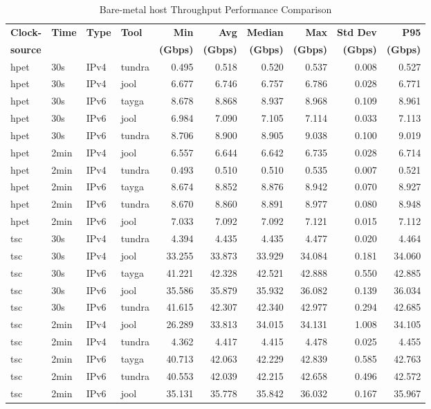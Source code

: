 \begin{table}[htbp]
\centering
\caption{Bare-metal host Throughput Performance Comparison}
\label{tab:throughput_comparison_localsingle}
\footnotesize
\begin{tabular}{|l|l|l|l|r|r|r|r|r|r|}
\hline
\textbf{Clock-} & \textbf{Time} & \textbf{Type} & \textbf{Tool} & \textbf{Min} & \textbf{Avg} & \textbf{Median} & \textbf{Max} & \textbf{Std Dev} & \textbf{P95} \\
\textbf{source} & & & & \textbf{(Gbps)} & \textbf{(Gbps)} & \textbf{(Gbps)} & \textbf{(Gbps)} & \textbf{(Gbps)} & \textbf{(Gbps)} \\
\hline
hpet & 30s & IPv4 & tundra & 0.495 & 0.518 & 0.520 & 0.537 & 0.008 & 0.527 \\
hpet & 30s & IPv4 & jool & 6.677 & 6.746 & 6.757 & 6.786 & 0.028 & 6.771 \\
hpet & 30s & IPv6 & tayga & 8.678 & 8.868 & 8.937 & 8.968 & 0.109 & 8.961 \\
hpet & 30s & IPv6 & jool & 6.984 & 7.090 & 7.105 & 7.114 & 0.033 & 7.113 \\
hpet & 30s & IPv6 & tundra & 8.706 & 8.900 & 8.905 & 9.038 & 0.100 & 9.019 \\
hpet & 2min & IPv4 & jool & 6.557 & 6.644 & 6.642 & 6.735 & 0.028 & 6.714 \\
hpet & 2min & IPv4 & tundra & 0.493 & 0.510 & 0.510 & 0.535 & 0.007 & 0.521 \\
hpet & 2min & IPv6 & tayga & 8.674 & 8.852 & 8.876 & 8.942 & 0.070 & 8.927 \\
hpet & 2min & IPv6 & tundra & 8.670 & 8.860 & 8.891 & 8.977 & 0.080 & 8.948 \\
hpet & 2min & IPv6 & jool & 7.033 & 7.092 & 7.092 & 7.121 & 0.015 & 7.112 \\
\hline
tsc & 30s & IPv4 & tundra & 4.394 & 4.435 & 4.435 & 4.477 & 0.020 & 4.464 \\
tsc & 30s & IPv4 & jool & 33.255 & 33.873 & 33.929 & 34.084 & 0.181 & 34.060 \\
tsc & 30s & IPv6 & tayga & 41.221 & 42.328 & 42.521 & 42.888 & 0.550 & 42.885 \\
tsc & 30s & IPv6 & jool & 35.586 & 35.879 & 35.932 & 36.082 & 0.139 & 36.034 \\
tsc & 30s & IPv6 & tundra & 41.615 & 42.307 & 42.340 & 42.977 & 0.294 & 42.685 \\
tsc & 2min & IPv4 & jool & 26.289 & 33.813 & 34.015 & 34.131 & 1.008 & 34.105 \\
tsc & 2min & IPv4 & tundra & 4.362 & 4.417 & 4.415 & 4.478 & 0.025 & 4.455 \\
tsc & 2min & IPv6 & tayga & 40.713 & 42.063 & 42.229 & 42.839 & 0.585 & 42.763 \\
tsc & 2min & IPv6 & tundra & 40.553 & 42.039 & 42.215 & 42.658 & 0.496 & 42.572 \\
tsc & 2min & IPv6 & jool & 35.131 & 35.778 & 35.842 & 36.032 & 0.167 & 35.967 \\
\hline
\end{tabular}
\end{table}

